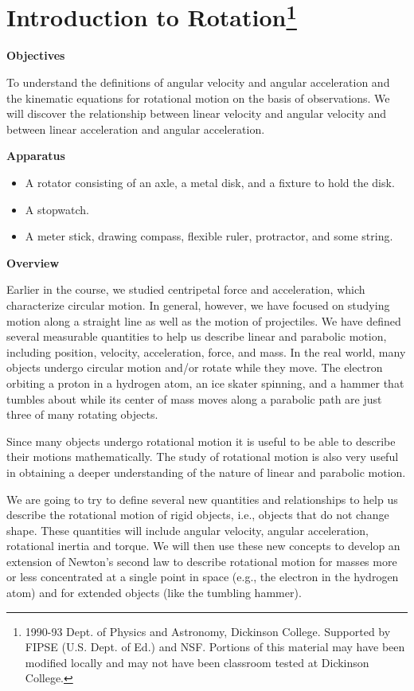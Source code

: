 
\section{Introduction to Rotation\footnote{
1990-93 Dept. of Physics and Astronomy, Dickinson College. Supported by FIPSE
(U.S. Dept. of Ed.) and NSF. Portions of this material may have been modified
locally and may not have been classroom tested at Dickinson College.
}}

\makelabheader %

\textbf{Objectives} 

To understand the definitions of angular velocity and angular acceleration and
the kinematic equations for rotational motion on the basis of observations.
We will discover the relationship between linear velocity and angular velocity
and between linear acceleration and angular acceleration.

\textbf{Apparatus}

\begin{itemize}
\item A rotator consisting of an axle, a metal disk, and a fixture to hold the disk. 
\item A stopwatch. 
\item A meter stick, drawing compass, flexible ruler, protractor, and some string.
\end{itemize}
\textbf{Overview }

Earlier in the course, we studied centripetal force and acceleration, which
characterize circular motion. In general, however, we have focused on studying
motion along a straight line as well as the motion of projectiles. We have defined
several measurable quantities to help us describe linear and parabolic motion,
including position, velocity, acceleration, force, and mass. In the real world,
many objects undergo circular motion and/or rotate while they move. The electron
orbiting a proton in a hydrogen atom, an ice skater spinning, and a hammer that
tumbles about while its center of mass moves along a parabolic path are just
three of many rotating objects. 

Since many objects undergo rotational motion it is useful to be able to describe
their motions mathematically. The study of rotational motion is also very useful
in obtaining a deeper understanding of the nature of linear and parabolic motion.

We are going to try to define several new quantities and relationships to help
us describe the rotational motion of rigid objects, i.e., objects that do not
change shape. These quantities will include angular velocity, angular acceleration,
rotational inertia and torque. We will then use these new concepts to develop
an extension of Newton's second law to describe rotational motion for masses
more or less concentrated at a single point in space (e.g., the electron in
the hydrogen atom) and for extended objects (like the tumbling hammer).

